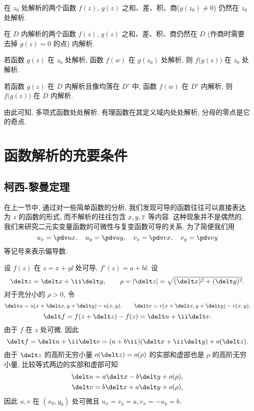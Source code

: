 \begin{theorem}
  \begin{enuma}
    \item 在 $z_0$ 处解析的两个函数 $f(z)$, $g(z)$ 之和、差、积、商($g(z_0)\neq 0$) 仍然在 $z_0$ 处解析.
    \item 在 $D$ 内解析的两个函数 $f(z)$, $g(z)$ 之和、差、积、商仍然在 $D$ (作商时需要去掉 $g(z)=0$ 的点) 内解析.
    \item 若函数 $g(z)$ 在 $z_0$ 处解析, 函数 $f(w)$ 在 $g(z_0)$ 处解析, 则 $f\bigl(g(z)\bigr)$ 在 $z_0$ 处解析.\footnotemark
    \item 若函数 $g(z)$ 在 $D$ 内解析且像均落在 $D'$ 中, 函数 $f(w)$ 在 $D'$ 内解析, 则 $f\bigl(g(z)\bigr)$ 在 $D$ 内解析.
  \end{enuma}
\end{theorem}

由此可知, 多项式函数处处解析. 有理函数在其定义域内处处解析, 分母的零点是它的奇点.



\section{函数解析的充要条件}

\subsection{柯西-黎曼定理}

在上一节中, 通过对一些简单函数的分析, 我们发现可导的函数往往可以直接表达为 $z$ 的函数的形式, 而不解析的往往包含 $x,y,\overline z$ 等内容.
这种现象并不是偶然的.
我们来研究二元实变量函数的可微性与复变函数可导的关系.
为了简便我们用
\[
  u_x=\pdv ux,\quad
  u_y=\pdv uy,\quad
  v_x=\pdv vx,\quad
  v_y=\pdv vy
\]
等记号来表示偏导数.

设 $f(z)$ 在 $z=x+y\ii$ 处可导, $f'(z)=a+b\ii$.
设
\[
  \delt z=\delt x+\ii\delt y,\qquad
  \rho=|{\delt z}|=\sqrt{(\delt x)^2+(\delt y)^2}.
\]
对于充分小的 $\rho>0$, 令
\[
  \delt u=u(x+\delt x,y+\delt y)-u(x,y),\qquad
  \delt v=v(x+\delt x,y+\delt y)-v(x,y),
\]
\[
   \delt f
  =f(z+\delt z)-f(z)
  =\delt u+\ii\delt v.
\]
由于 $f$ 在 $z$ 处可微, 因此
\[
   \delt f
  =\delt u+\ii\delt v
  =(a+b\ii)(\delt x+\ii\delt y)+o(\delt z).
\]
由于 $\delt z$ 的高阶无穷小量 $o(\delt z)=o(\rho)$ 的实部和虚部也是 $\rho$ 的高阶无穷小量, 比较等式两边的实部和虚部可知
\begin{align*}
  \delt u&=a\delt x-b\delt y+o(\rho),\\
  \delt v&=b\delt x+a\delt y+o(\rho),
\end{align*}
因此 $u,v$ 在 $(x_0,y_0)$ 处可微且 $u_x=v_y=a,v_x=-u_y=b$.


